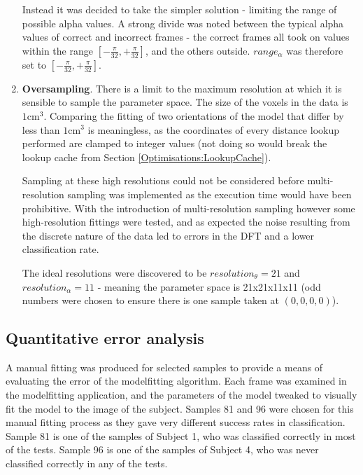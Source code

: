 \begin{enumerate}
		Instead it was decided to take the simpler solution - limiting the range of possible alpha values.
		A strong divide was noted between the typical alpha values of correct and incorrect frames - the correct frames all took on
		values within the range $\left[ -\frac{\pi}{32}, +\frac{\pi}{32}\right]$, and the others outside.
		$range_\alpha$ was therefore set to $\left[ -\frac{\pi}{32}, +\frac{\pi}{32}\right]$.
	
	\item \textbf{Oversampling}.
		There is a limit to the maximum resolution at which it is sensible to sample the parameter space.
		The size of the voxels in the data is $1\text{cm}^3$.
		Comparing the fitting of two orientations of the model that differ by less than $1\text{cm}^3$ is meaningless,
		as the coordinates of every distance lookup performed are clamped to integer values (not doing so would break
		the lookup cache from Section \ref{Optimisations:LookupCache}).
		
		Sampling at these high resolutions could not be considered before multi-resolution sampling was implemented
		as the execution time would have been prohibitive.
		With the introduction of multi-resolution sampling however some high-resolution fittings were tested, and as expected
		the noise resulting from the discrete nature of the data led to errors in the DFT and a lower classification rate.
		
		The ideal resolutions were discovered to be $resolution_\theta = 21$ and $resolution_\alpha = 11$ - meaning the
		parameter space is 21x21x11x11 (odd numbers were chosen to ensure there is one sample taken at $(0, 0, 0, 0)$).
\end{enumerate}


\subsection{Quantitative error analysis}
\label{Modelfitting:ErrorAnalysis}

A manual fitting was produced for selected samples to provide a means of evaluating the error of the modelfitting algorithm.
Each frame was examined in the modelfitting application, and the parameters of the model tweaked to visually fit the model to the image of the subject.
Samples 81 and 96 were chosen for this manual fitting process as they gave very different success rates in classification.
Sample 81 is one of the samples of Subject 1, who was classified correctly in most of the tests.
Sample 96 is one of the samples of Subject 4, who was never classified correctly in any of the tests.

